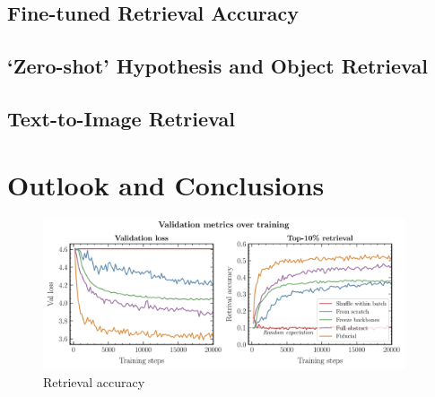 \documentclass[10pt]{article} %
\begin{document}

\subsection{Fine-tuned Retrieval Accuracy}
\label{sec:retrieval_acc}

\subsection{`Zero-shot' Hypothesis and Object Retrieval}
\label{sec:zero_shot}

\subsection{Text-to-Image Retrieval}
\label{sec:tti}

\section{Outlook and Conclusions}
\label{sec:conclusion}



  

\begin{figure}[!h]
\includegraphics[width=0.95\textwidth]{plots/val_metrics.pdf}
\caption{Retrieval accuracy}
\label{fig:retrieval_acc}
\end{figure}
\end{document}
